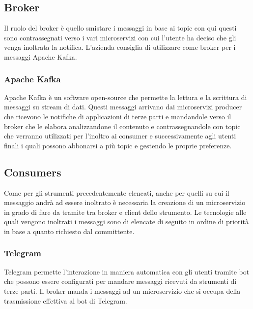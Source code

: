		
	\subsection{Broker}
	
		Il ruolo del broker è quello smistare i messaggi in base ai topic con qui questi sono contrassegnati verso i vari microservizi con cui l'utente ha deciso che gli venga inoltrata la notifica.
		L'azienda consiglia di utilizzare come broker per i messaggi Apache Kafka.
	
		\subsubsection{Apache Kafka}
		Apache Kafka è un software open-source che permette la lettura e la scrittura di messaggi su stream di dati.
		Questi messaggi arrivano dai microservizi producer che ricevono le notifiche di applicazioni di terze parti e mandandole verso il broker che le elabora analizzandone il contenuto e contrassegnandole con topic che verranno utilizzati per l'inoltro ai consumer e successivamente agli utenti finali i quali possono abbonarsi a più topic e gestendo le proprie preferenze.
		
	
	\subsection{Consumers}
		Come per gli strumenti precedentemente elencati, anche per quelli su cui il messaggio andrà ad essere inoltrato è necessaria la creazione di un microservizio in grado di fare da tramite tra broker e client dello strumento.
		Le tecnologie alle quali vengono inoltrati i messaggi sono di elencate di seguito in ordine di priorità in base a quanto richiesto dal committente.
			
		\subsubsection{Telegram}
		Telegram permette l'interazione in maniera automatica con gli utenti tramite bot che possono essere configurati per mandare messaggi ricevuti da strumenti di terze parti.
		Il broker manda i messaggi ad un microservizio che si occupa della trasmissione effettiva al bot di Telegram.
		
